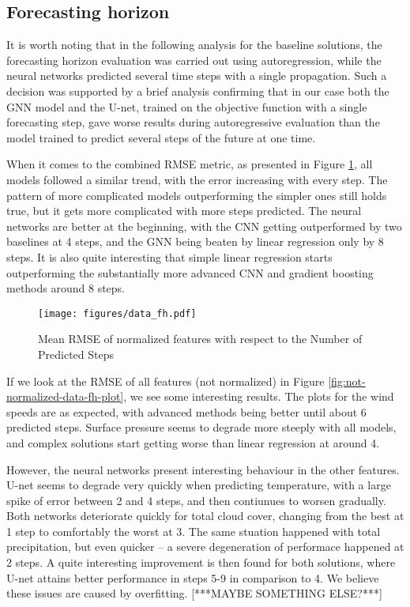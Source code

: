 \FloatBarrier

\subsection{Forecasting horizon}
It is worth noting that in the following analysis for the baseline solutions, the forecasting horizon evaluation was carried out using autoregression, while the neural networks predicted several time steps with a single propagation. Such a decision was supported by a brief analysis confirming that in our case both the GNN model and the U-net, trained on the objective function with a single forecasting step, gave worse results during autoregressive evaluation than the model trained to predict several steps of the future at one time.

When it comes to the combined RMSE metric, as presented in Figure \ref{fig:data-fh-plot}, all models followed a similar trend, with the error increasing with every step. The pattern of more complicated models outperforming the simpler ones still holds true, but it gets more complicated with more steps predicted. The neural networks are better at the beginning, with the CNN getting outperformed by two baselines at 4 steps, and the GNN being beaten by linear regression only by 8 steps. It is also quite interesting that simple linear regression starts outperforming the substantially more advanced CNN and gradient boosting methods around 8 steps.   
\begin{figure}[!ht]
    \centering
    \texttt{[image: figures/data\_fh.pdf]}
    \caption{Mean RMSE of normalized features with respect to the Number of Predicted Steps}
    \label{fig:data-fh-plot}
\end{figure}

If we look at the RMSE of all features (not normalized) in Figure \ref{fig:not-normalized-data-fh-plot}, we see some interesting results. The plots for the wind speeds are as expected, with advanced methods being better until about 6 predicted steps. Surface pressure seems to degrade more steeply with all models, and complex solutions start getting worse than linear regression at around 4.

However, the neural networks present interesting behaviour in the other features. U-net seems to degrade very quickly when predicting temperature, with a large spike of error between 2 and 4 steps, and then contiunues to worsen gradually. Both networks deteriorate quickly for total cloud cover, changing from the best at 1 step to comfortably the worst at 3. The same stuation happened with total precipitation, but even quicker -- a severe degeneration of performace happened at 2 steps. A quite interesting improvement is then found for both solutions, where U-net attains better performance in steps 5-9 in comparison to 4. We believe these issues are caused by overfitting. [***MAYBE SOMETHING ELSE?***]

